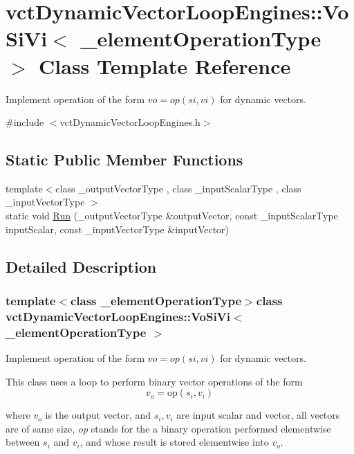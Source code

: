 \hypertarget{classvct_dynamic_vector_loop_engines_1_1_vo_si_vi}{}\section{vct\+Dynamic\+Vector\+Loop\+Engines\+:\+:Vo\+Si\+Vi$<$ \+\_\+element\+Operation\+Type $>$ Class Template Reference}
\label{classvct_dynamic_vector_loop_engines_1_1_vo_si_vi}


Implement operation of the form $vo = op(si, vi)$ for dynamic vectors.  




{\ttfamily \#include $<$vct\+Dynamic\+Vector\+Loop\+Engines.\+h$>$}

\subsection*{Static Public Member Functions}
\begin{DoxyCompactItemize}
\item 
{\footnotesize template$<$class \+\_\+output\+Vector\+Type , class \+\_\+input\+Scalar\+Type , class \+\_\+input\+Vector\+Type $>$ }\\static void \hyperlink{classvct_dynamic_vector_loop_engines_1_1_vo_si_vi_a276329ee86e7059f7bbb3efc471bd21f}{Run} (\+\_\+output\+Vector\+Type \&output\+Vector, const \+\_\+input\+Scalar\+Type input\+Scalar, const \+\_\+input\+Vector\+Type \&input\+Vector)
\end{DoxyCompactItemize}


\subsection{Detailed Description}
\subsubsection*{template$<$class \+\_\+element\+Operation\+Type$>$class vct\+Dynamic\+Vector\+Loop\+Engines\+::\+Vo\+Si\+Vi$<$ \+\_\+element\+Operation\+Type $>$}

Implement operation of the form $vo = op(si, vi)$ for dynamic vectors. 

This class uses a loop to perform binary vector operations of the form \[ v_o = \mathrm{op}(s_i, v_i) \]

where $v_o$ is the output vector, and $s_i, v_i$ are input scalar and vector, all vectors are of same size, {\itshape op} stands for the a binary operation performed elementwise between $s_i$ and $v_i$, and whose result is stored elementwise into $v_o$.


